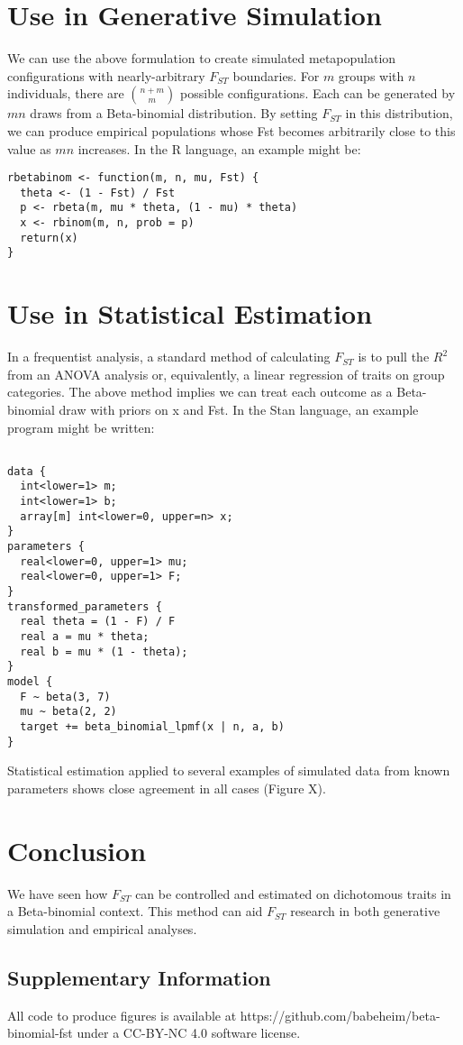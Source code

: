 \documentclass[11pt]{article}
\begin{document}
\section{Use in Generative Simulation}

We can use the above formulation to create simulated metapopulation configurations with nearly-arbitrary $F_{ST}$ boundaries. For $m$ groups with $n$ individuals, there are $\binom{n + m}{m}$ possible configurations. Each can be generated by $mn$ draws from a Beta-binomial distribution. By setting $F_{ST}$ in this distribution, we can produce empirical populations whose Fst becomes arbitrarily close to this value as $mn$ increases. In the R language, an example might be:

\begin{verbatim}
rbetabinom <- function(m, n, mu, Fst) {
  theta <- (1 - Fst) / Fst
  p <- rbeta(m, mu * theta, (1 - mu) * theta)
  x <- rbinom(m, n, prob = p)
  return(x)
}
\end{verbatim}

\section{Use in Statistical Estimation}

In a frequentist analysis, a standard method of calculating $F_{ST}$ is to pull the $R^2$ from an ANOVA analysis or, equivalently, a linear regression of traits on group categories. The above method implies we can treat each outcome as a Beta-binomial draw with priors on x and Fst. In the Stan language, an example program might be written:

\begin{verbatim}

data {
  int<lower=1> m;
  int<lower=1> b;
  array[m] int<lower=0, upper=n> x;
}
parameters {
  real<lower=0, upper=1> mu;
  real<lower=0, upper=1> F;
}
transformed_parameters {
  real theta = (1 - F) / F
  real a = mu * theta;
  real b = mu * (1 - theta);
}
model {
  F ~ beta(3, 7)
  mu ~ beta(2, 2) 
  target += beta_binomial_lpmf(x | n, a, b)
}
\end{verbatim}

Statistical estimation applied to several examples of simulated data from known parameters shows close agreement in all cases (Figure X).

\section{Conclusion}

We have seen how $F_{ST}$ can be controlled and estimated on dichotomous traits in a Beta-binomial context. This method can aid $F_{ST}$ research in both generative simulation and empirical analyses.

\subsection*{Supplementary Information}

All code to produce figures is available at https://github.com/babeheim/beta-binomial-fst under a CC-BY-NC 4.0 software license.
\end{document}
